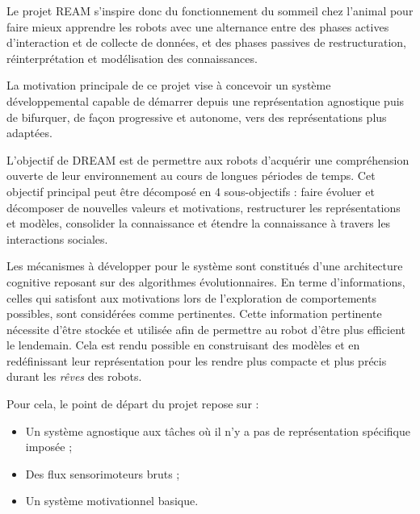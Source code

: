 \documentclass{llncs}
\newcommand*\circled[1]{\tikz[baseline=(char.base)]{\node[shape=circle,draw,inner sep=2pt] (char) {#1};}}
\begin{document}

Le projet REAM s'inspire donc du fonctionnement du sommeil chez l'animal pour faire mieux apprendre les robots avec une alternance entre des phases actives d'interaction et de collecte de données, et des phases passives de restructuration, réinterprétation et modélisation des connaissances.

La motivation principale de ce projet vise à concevoir un système développemental capable de démarrer depuis une représentation agnostique puis de bifurquer, de façon progressive et autonome, vers des représentations plus adaptées.

L'objectif de DREAM est de permettre aux robots d'acquérir une compréhension ouverte de leur environnement au cours de longues périodes de temps.
Cet objectif principal peut être décomposé en 4 sous-objectifs : \circled{1} faire évoluer et décomposer de nouvelles valeurs et motivations, \circled{2} restructurer les représentations et modèles, \circled{3} consolider la connaissance et \circled{4} étendre la connaissance à travers les interactions sociales.

Les mécanismes à développer pour le système sont constitués d'une architecture cognitive reposant sur des algorithmes évolutionnaires. 
En terme d'informations, celles qui satisfont aux motivations lors de l'exploration de comportements possibles, sont considérées comme pertinentes.
Cette information pertinente nécessite d'être stockée et utilisée afin de permettre au robot d'être plus efficient le lendemain.
Cela est rendu possible en construisant des modèles et en redéfinissant leur représentation pour les rendre plus compacte et plus précis durant les \textit{rêves} des robots.

Pour cela, le point de départ du projet repose sur : 

\begin{itemize}
  \item Un système agnostique aux tâches où il n'y a pas de représentation spécifique imposée ;
  \item Des flux sensorimoteurs bruts ;
  \item Un système motivationnel basique.
\end{itemize}
\end{document}
